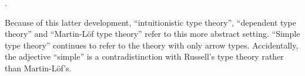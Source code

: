 \begin{concept}\label{con:dependent_types}

  .
\end{concept}

\begin{remark}\label{rem:dependent_type_theory}
  Because of this latter development, \enquote{intuitionistic type theory}, \enquote{dependent type theory} and \enquote{Martin-L\"of type theory} refer to this more abstract setting. \enquote{Simple type theory} continues to refer to the theory with only arrow types. Accidentally, the adjective \enquote{simple} is a contradistinction with Russell's type theory rather than Martin-L\"of's.
\end{remark}
